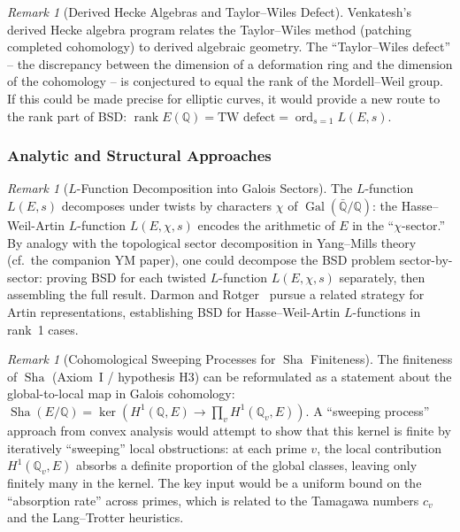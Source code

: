 \documentclass[aps,prd,twocolumn,superscriptaddress,nofootinbib,floatfix]{revtex4-2}
\theoremstyle{definition}
\theoremstyle{remark}
\newtheorem{remark}[theorem]{Remark}
\DeclareMathOperator{\ord}{ord}
\DeclareMathOperator{\rank}{rank}
\DeclareMathOperator{\Sha}{Sha}
\DeclareMathOperator{\Gal}{Gal}
\begin{document}
\begin{remark}[Derived Hecke Algebras and Taylor--Wiles Defect]
\label{rem:derived-hecke}
Venkatesh's derived Hecke algebra program relates the Taylor--Wiles method (patching completed cohomology) to derived algebraic geometry. The ``Taylor--Wiles defect'' -- the discrepancy between the dimension of a deformation ring and the dimension of the cohomology -- is conjectured to equal the rank of the Mordell--Weil group. If this could be made precise for elliptic curves, it would provide a new route to the rank part of BSD: $\rank E(\mathbb{Q}) = \text{TW defect} = \ord_{s=1} L(E,s)$.
\end{remark}

\subsubsection{Analytic and Structural Approaches}

\begin{remark}[$L$-Function Decomposition into Galois Sectors]
\label{rem:galois-sectors}
The $L$-function $L(E,s)$ decomposes under twists by characters $\chi$ of $\Gal(\bar{\mathbb{Q}}/\mathbb{Q})$: the Hasse--Weil-Artin $L$-function $L(E, \chi, s)$ encodes the arithmetic of $E$ in the ``$\chi$-sector.'' By analogy with the topological sector decomposition in Yang--Mills theory (cf.\ the companion YM paper), one could decompose the BSD problem sector-by-sector: proving BSD for each twisted $L$-function $L(E, \chi, s)$ separately, then assembling the full result. Darmon and Rotger~\cite{DarmonRotger2017} pursue a related strategy for Artin representations, establishing BSD for Hasse--Weil-Artin $L$-functions in rank~1 cases.
\end{remark}

\begin{remark}[Cohomological Sweeping Processes for $\Sha$ Finiteness]
\label{rem:sweeping-sha}
The finiteness of $\Sha$ (Axiom~I / hypothesis H3) can be reformulated as a statement about the global-to-local map in Galois cohomology: $\Sha(E/\mathbb{Q}) = \ker\!\left(H^1(\mathbb{Q}, E) \to \prod_v H^1(\mathbb{Q}_v, E)\right)$. A ``sweeping process'' approach from convex analysis would attempt to show that this kernel is finite by iteratively ``sweeping'' local obstructions: at each prime $v$, the local contribution $H^1(\mathbb{Q}_v, E)$ absorbs a definite proportion of the global classes, leaving only finitely many in the kernel. The key input would be a uniform bound on the ``absorption rate'' across primes, which is related to the Tamagawa numbers $c_v$ and the Lang--Trotter heuristics.
\end{remark}
\end{document}
